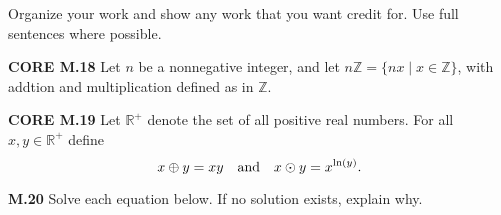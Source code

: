 \documentclass[addpoints]{exam}
\begin{document}
Organize your work and show any work that you want credit for. Use full sentences where possible.

\begin{questions}

\question \textbf{CORE M.18}
Let $n$ be a nonnegative integer, and let $n\mathbb{Z}=\{nx\mid x\in\mathbb{Z}\}$, with addtion and multiplication defined as in $\mathbb{Z}$. 


\question \textbf{CORE M.19}
Let $\mathbb{R}^+$ denote the set of all positive real numbers. For all $x,y\in\mathbb{R}^+$ define 
\[
x\oplus y=xy\text{\quad and\quad} x\odot y=x^{\ln(y)}.
\]


\question \textbf{M.20}
Solve each equation below. If no solution exists, explain why.
\begin{parts}

\end{parts}
\end{questions}
\end{document}
